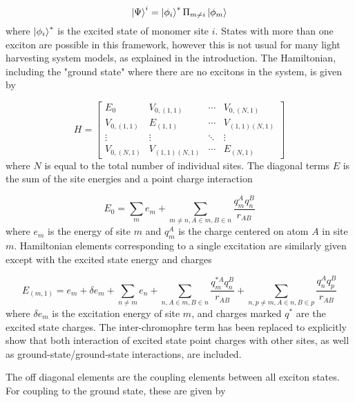 \begin{equation}
    \ket{\Psi}^i = \ket{\phi_i}^\ast \Pi_{m \neq i}  \ket{\phi_m}
\end{equation}
%
where $\ket{\phi_i}^\ast$ is the excited state of monomer site $i$. States with 
more than one exciton are possible in this framework, however this is not usual 
for many light harvesting system models, as explained in the introduction. The Hamiltonian, 
including the "ground state" where there are no excitons in the system, is given 
by

\begin{equation}
    H = 
    \begin{bmatrix}
        E_0 & V_{0, \left(1, 1\right)} & \cdots & V_{0, \left(N, 1\right)} \\
        V_{0, \left(1, 1\right)} & E_{\left(1,1\right)} & \cdots & V_{\left(1,1\right) \left(N, 1\right)} \\
        \vdots & \vdots & \ddots & \vdots \\
        V_{0, \left(N, 1\right)} & V_{\left(1,1\right) \left(N, 1\right)} & \cdots & E_{\left(N, 1\right)}
    \end{bmatrix}
\end{equation}
%
where $N$ is equal to the total number of individual sites. The diagonal terms $E$
is the sum of the site energies and a point charge interaction

\begin{equation}
    E_0 = \sum_m e_m + \sum_{m \neq n, A \in m, B \in n} \frac{q^A_m q^B_n}{r_{AB}}
\end{equation}
%
where $e_m$ is the energy of site $m$ and $q^A_m$ is the charge centered on atom
$A$ in site $m$. Hamiltonian elements corresponding to a single excitation are similarly
given except with the excited state energy and charges

\begin{equation}
    E_{\left(m,1\right)} = e_m + \delta e_m + \sum_{n \neq m} e_n + \sum_{n, A \in m, B \in n} \frac{q^{\ast A}_m q^B_n}{r_{AB}} + \sum_{n,p \neq m, A \in n, B \in p} \frac{q^{A}_n q^B_p}{r_{AB}}
\end{equation}
%
where $\delta e_m$ is the excitation energy of site $m$, and charges marked $q^\ast$
are the excited state charges. The inter-chromophre term has been replaced to explicitly
show that both interaction of excited state point charges with other sites, as well
as ground-state/ground-state interactions, are included.

The off diagonal elements are the coupling elements between all exciton states.
For coupling to the ground state, these are given by

